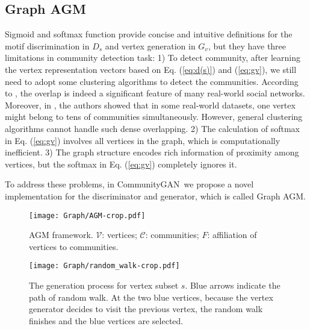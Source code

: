 \documentclass[sigconf]{acmart}
\newcommand{\ComGAN}{CommunityGAN}
\begin{document}
\subsection{Graph AGM}
\label{sec:graph-agm}

Sigmoid and softmax function provide concise and intuitive definitions for the motif discrimination in $D_s$ and vertex generation in $G_v$, but they have three limitations in community detection task:
1) To detect community, after learning the vertex representation vectors based on Eq. (\ref{eq:d(s)}) and (\ref{eq:gv}), we still need to adopt some clustering algorithms to detect the communities.
According to \cite{DBLP:journals/corr/abs-1110-5813}, the overlap is indeed a significant feature of many real-world social networks.
Moreover, in \cite{yang2012community}, the authors showed that in some real-world datasets, one vertex might belong to tens of communities simultaneously.
However, general clustering algorithms cannot handle such dense overlapping.
2) The calculation of softmax in Eq. (\ref{eq:gv}) involves all vertices in the graph, which is computationally inefficient.
3) The graph structure encodes rich information of proximity among vertices, but the softmax in Eq. (\ref{eq:gv}) completely ignores it.

To address these problems, in \ComGAN~we propose a novel implementation for the discriminator and generator, which is called Graph AGM.


\begin{figure}[]
\texttt{[image: Graph/AGM-crop.pdf]}
\caption{AGM framework. $\mathcal{V}$: vertices; $\mathcal{C}$: communities; $F$: affiliation of vertices to communities.}
\label{fig:AGM}
\end{figure}


\begin{figure*}[t]
\texttt{[image: Graph/random\_walk-crop.pdf]}
\caption{The generation process for vertex subset $s$. Blue arrows indicate the path of random walk. At the two blue vertices, because the vertex generator decides to visit the previous vertex, the random walk finishes and the blue vertices are selected.}
\label{fig:random_walk}
\end{figure*}
\end{document}
